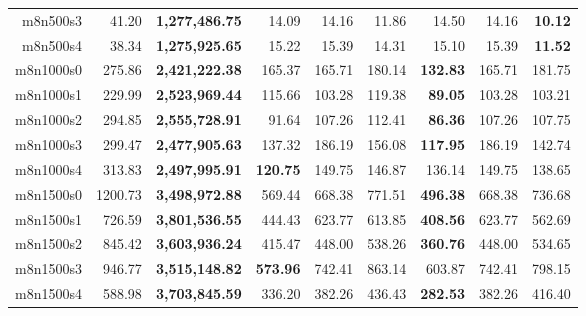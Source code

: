 \documentclass{article}
\begin{document}
\begin{landscape}
\begin{table}[!htb]
\begin{tabular}{rrrrrrrrr}
      m8n500s3 & 41.20 & \textbf{1,277,486.75} & 14.09 & 14.16 & 11.86 & 14.50 & 14.16 & \textbf{10.12} \\
      m8n500s4 & 38.34 & \textbf{1,275,925.65} & 15.22 & 15.39 & 14.31 & 15.10 & 15.39 & \textbf{11.52} \\
      m8n1000s0 & 275.86 & \textbf{2,421,222.38} & 165.37 & 165.71 & 180.14 & \textbf{132.83} & 165.71 & 181.75 \\
      m8n1000s1 & 229.99 & \textbf{2,523,969.44} & 115.66 & 103.28 & 119.38 & \textbf{89.05} & 103.28 & 103.21 \\
      m8n1000s2 & 294.85 & \textbf{2,555,728.91} & 91.64 & 107.26 & 112.41 & \textbf{86.36} & 107.26 & 107.75 \\
      m8n1000s3 & 299.47 & \textbf{2,477,905.63} & 137.32 & 186.19 & 156.08 & \textbf{117.95} & 186.19 & 142.74 \\
      m8n1000s4 & 313.83 & \textbf{2,497,995.91} & \textbf{120.75} & 149.75 & 146.87 & 136.14 & 149.75 & 138.65 \\
      m8n1500s0 & 1200.73 & \textbf{3,498,972.88} & 569.44 & 668.38 & 771.51 & \textbf{496.38} & 668.38 & 736.68 \\
      m8n1500s1 & 726.59 & \textbf{3,801,536.55} & 444.43 & 623.77 & 613.85 & \textbf{408.56} & 623.77 & 562.69 \\
      m8n1500s2 & 845.42 & \textbf{3,603,936.24} & 415.47 & 448.00 & 538.26 & \textbf{360.76} & 448.00 & 534.65 \\
      m8n1500s3 & 946.77 & \textbf{3,515,148.82} & \textbf{573.96} & 742.41 & 863.14 & 603.87 & 742.41 & 798.15 \\
      m8n1500s4 & 588.98 & \textbf{3,703,845.59} & 336.20 & 382.26 & 436.43 & \textbf{282.53} & 382.26 & 416.40 \\
      \bottomrule
   \end{tabular}
\end{table}

\end{landscape}



\end{document}
